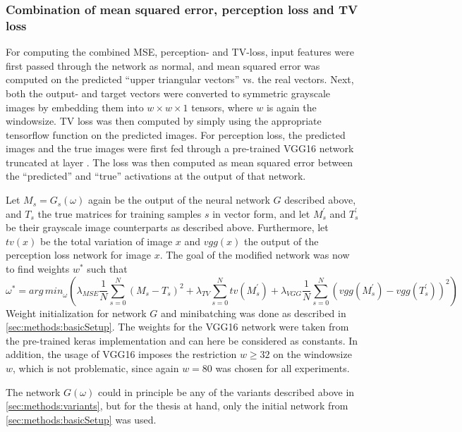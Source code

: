 \subsubsection{Combination of mean squared error, perception loss and TV loss} \label{sec:methods:combined_loss}
For computing the combined MSE, perception- and TV-loss,
input features were first passed through the network as normal,
and mean squared error was computed on the predicted ``upper triangular vectors'' vs. the real vectors.
Next, both the output- and target vectors were converted to symmetric grayscale images by embedding them into 
$w \times w \times 1$ tensors, where $w$ is again the windowsize.
TV loss was then computed by simply using the appropriate tensorflow function on the predicted images.
For perception loss, the predicted images and the true images were first fed through a pre-trained VGG16 network truncated at layer \xxx.
The loss was then computed as mean squared error between the ``predicted'' and ``true'' activations at the output of that network.

Let $M_s=G_s(\omega)$ again be the output of the neural network $G$ described above, and $T_s$ the true matrices for training samples $s$ in vector form,
and let $M^\prime_s$ and $T^\prime_s$ be their grayscale image counterparts as described above.
Furthermore, let $\mathit{tv}(x)$ be the total variation of image $x$ and $\mathit{vgg}(x)$ the output of the perception loss network for image $x$.
The goal of the modified network was now to find weights $w^*$ such that
\begin{equation}
 \omega^* = \mathit{arg\,min}_\omega (  \lambda_\mathit{MSE} \frac{1}{N} \sum_{s=0}^N (M_s - T_s)^2 
                                                     + \lambda_\mathit{TV} \sum_{s=0}^N \mathit{tv}( M^\prime_s) 
                                                     + \lambda_\mathit{VGG} \frac{1}{N} \sum_{s=0}^N (\mathit{vgg}(M^\prime_s) - \mathit{vgg}(T^\prime_s))^2 )
\end{equation}
Weight initialization for network $G$ and minibatching was done as described in \cref{sec:methods:basicSetup}.
The weights for the VGG16 network were taken from the pre-trained keras implementation and can here be considered as constants.
In addition, the usage of VGG16 imposes the restriction $w \geq 32$ on the windowsize $w$, which is not problematic, since again $w=80$ was chosen for all experiments.

The network $G(\omega)$ could in principle be any of the variants described above in \cref{sec:methods:variants},
but for the thesis at hand, only the initial network from \cref{sec:methods:basicSetup} was used.

